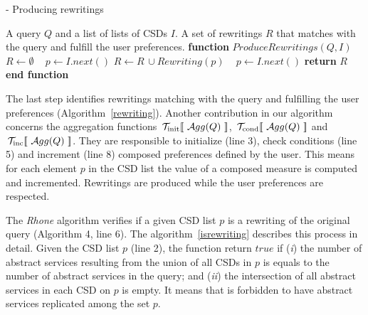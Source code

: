 \begin{algorithm}
\small
\caption{ - Producing rewritings}
\label{rewriting}
\begin{algorithmic}[1]
\REQUIRE A query $Q$ and a list of lists of CSDs $I$.
\ENSURE A set of rewritings $R$ that matches with the query and fulfill the user preferences.
\STATE \textbf{function} $\mathit{ProduceRewritings} (Q, I)$
	\STATE $R\leftarrow \emptyset$
	\STATE ~\! 
    \STATE $p \leftarrow I.next()$
			\STATE $R\leftarrow R\,\cup \mathit{Rewriting}(p)$
			\STATE ~\!
		\ENDIF
		\STATE $p \leftarrow I.\mathit{next}()$
	\ENDWHILE
    \STATE \textbf{return} $R$
\STATE \textbf{end function}
\end{algorithmic}
\end{algorithm}

%
The last step identifies rewritings matching with the query and fulfilling the user preferences (Algorithm~\ref{rewriting}). %
%
%
Another contribution in our algorithm concerns the aggregation functions $~\!\hbox{${\cal T}_{\mathrm{init}} [\![\ {\cal A}{gg}(Q)\ ]\!]$}$, $~\!\hbox{${\cal T}_{\mathrm{cond}} [\![\ {\cal A}{gg}(Q)\ ]\!]$}$ and $~\!\hbox{${\cal T}_{\mathrm{inc}} [\![\ {\cal A}{gg}(Q)\ ]\!]$}$.
They are responsible to initialize (line 3), check conditions (line 5) and increment (line 8) composed preferences defined by the user.
This means for each element $p$ in the CSD list the value of a composed measure is computed and incremented. 
Rewritings are produced while the user preferences are respected. 

The \textit{Rhone} algorithm verifies if a given CSD list $p$ is a rewriting
of the original query (Algorithm 4, line 6).
The algorithm~\ref{isrewriting} describes this process in detail. 
Given the CSD list $p$ (line 2), the function return $true$ if (\textit{i}) the number of
abstract services resulting from the union of all CSDs in $p$ is equals to
the number of abstract services in the query; and (\textit{ii}) the intersection
of all abstract services in each CSD on $p$ is empty.
It means that is forbidden to have abstract services replicated among the set $p$.

